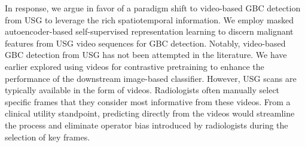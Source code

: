 In response, we argue in favor of a paradigm shift to video-based GBC detection from USG to leverage the rich spatiotemporal information. We employ masked autoencoder-based self-supervised representation learning to discern malignant features from USG video sequences for GBC detection. Notably, video-based GBC detection from USG has not been attempted in the literature. We have earlier explored using videos for contrastive pretraining to enhance the performance of the downstream image-based classifier. However, USG scans are typically available in the form of videos. Radiologists often manually select specific frames that they consider most informative from these videos. From a clinical utility standpoint, predicting directly from the videos would streamline the process and eliminate operator bias introduced by radiologists during the selection of key frames.

